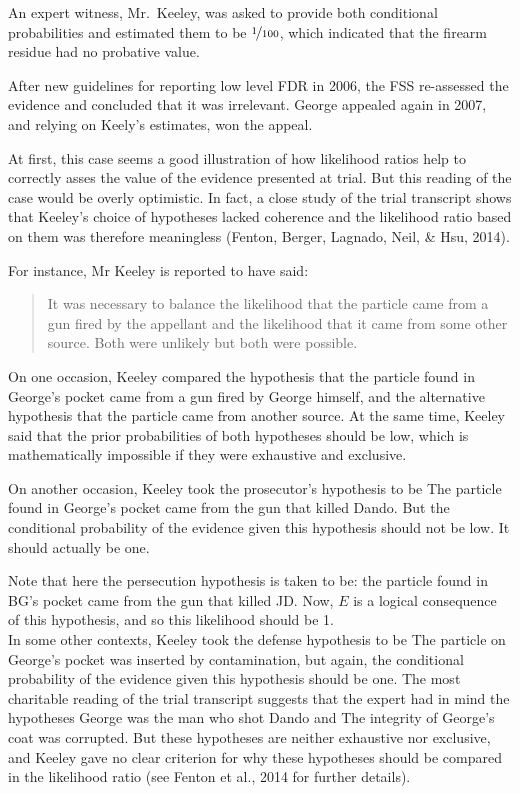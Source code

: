 \documentclass[10pt,dvipsnames,enabledeprecatedfontcommands]{scrartcl}
\begin{document}
\noindent  An expert witness, Mr.~Keeley, was asked to provide both
conditional probabilities and estimated them to be
\(\nicefrac{1}{100}\), which indicated that the firearm residue had no
probative value.

After new guidelines for reporting low level FDR in 2006, the FSS
re-assessed the evidence and concluded that it was irrelevant. George
appealed again in 2007, and relying on Keely's estimates, won the
appeal.

At first, this case seems a good illustration of how likelihood ratios
help to correctly asses the value of the evidence presented at trial.
But this reading of the case would be overly optimistic. In fact, a
close study of the trial transcript shows that Keeley's choice of
hypotheses lacked coherence and the likelihood ratio based on them was
therefore meaningless (Fenton, Berger, Lagnado, Neil, \& Hsu, 2014).

For instance, Mr Keeley is reported to have said:

\begin{quote}
    It was necessary to balance the likelihood that the particle came from a gun fired by the appellant and the likelihood that it came from some other source. Both were unlikely but both were possible.
\end{quote}

\noindent  On one occasion, Keeley compared the hypothesis that the
particle found in George's pocket came from a gun fired by George
himself, and the alternative hypothesis that the particle came from
another source. At the same time, Keeley said that the prior
probabilities of both hypotheses should be low, which is mathematically
impossible if they were exhaustive and exclusive.

On another occasion, Keeley took the prosecutor's hypothesis to be
\textsf{The particle found in George's pocket came from the gun that killed Dando}.
But the conditional probability of the evidence given this hypothesis
should not be low. It should actually be one.

\noindent Note that here the persecution hypothesis is taken to be:
\textsf{the particle found in BG's pocket came from the gun that killed JD.}
Now, \(E\) is a logical consequence of this hypothesis, and so this
likelihood should be 1.\\
In some other contexts, Keeley took the defense hypothesis to be
\textsf{The particle on George's pocket was inserted by contamination},
but again, the conditional probability of the evidence given this
hypothesis should be one. The most charitable reading of the trial
transcript suggests that the expert had in mind the hypotheses
\textsf{George was the man who shot Dando} and
\textsf{The integrity of George's coat was corrupted.} But these
hypotheses are neither exhaustive nor exclusive, and Keeley gave no
clear criterion for why these hypotheses should be compared in the
likelihood ratio (see Fenton et al., 2014 for further details).
\end{document}
